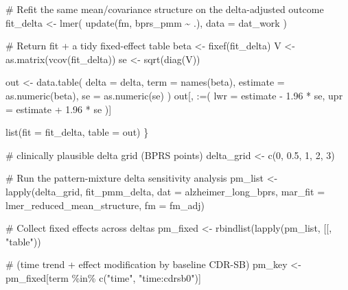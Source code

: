 \documentclass[
  9pt,
  letterpaper,
  DIV=11,
  numbers=noendperiod]{scrartcl}
\newenvironment{Shaded}{\begin{snugshade}}{\end{snugshade}}
\newcommand{\AttributeTok}[1]{\textcolor[rgb]{0.40,0.45,0.13}{#1}}
\newcommand{\CommentTok}[1]{\textcolor[rgb]{0.37,0.37,0.37}{#1}}
\newcommand{\DecValTok}[1]{\textcolor[rgb]{0.68,0.00,0.00}{#1}}
\newcommand{\FloatTok}[1]{\textcolor[rgb]{0.68,0.00,0.00}{#1}}
\newcommand{\FunctionTok}[1]{\textcolor[rgb]{0.28,0.35,0.67}{#1}}
\newcommand{\NormalTok}[1]{\textcolor[rgb]{0.00,0.23,0.31}{#1}}
\newcommand{\OtherTok}[1]{\textcolor[rgb]{0.00,0.23,0.31}{#1}}
\newcommand{\SpecialCharTok}[1]{\textcolor[rgb]{0.37,0.37,0.37}{#1}}
\newcommand{\StringTok}[1]{\textcolor[rgb]{0.13,0.47,0.30}{#1}}
\begin{document}
\begin{Shaded}
\begin{Highlighting}[]
  \CommentTok{\# Refit the same mean/covariance structure on the delta{-}adjusted outcome}
\NormalTok{  fit\_delta }\OtherTok{\textless{}{-}} \FunctionTok{lmer}\NormalTok{(}
    \FunctionTok{update}\NormalTok{(fm, bprs\_pmm }\SpecialCharTok{\textasciitilde{}}\NormalTok{ .),}
    \AttributeTok{data =}\NormalTok{ dat\_work}
\NormalTok{  )}

  \CommentTok{\# Return fit + a tidy fixed{-}effect table}
\NormalTok{  beta  }\OtherTok{\textless{}{-}} \FunctionTok{fixef}\NormalTok{(fit\_delta)}
\NormalTok{  V     }\OtherTok{\textless{}{-}} \FunctionTok{as.matrix}\NormalTok{(}\FunctionTok{vcov}\NormalTok{(fit\_delta))}
\NormalTok{  se    }\OtherTok{\textless{}{-}} \FunctionTok{sqrt}\NormalTok{(}\FunctionTok{diag}\NormalTok{(V))}

\NormalTok{  out }\OtherTok{\textless{}{-}} \FunctionTok{data.table}\NormalTok{(}
    \AttributeTok{delta =}\NormalTok{ delta,}
    \AttributeTok{term  =} \FunctionTok{names}\NormalTok{(beta),}
    \AttributeTok{estimate =} \FunctionTok{as.numeric}\NormalTok{(beta),}
    \AttributeTok{se =} \FunctionTok{as.numeric}\NormalTok{(se)}
\NormalTok{  )}
\NormalTok{  out[, }\StringTok{\textasciigrave{}}\AttributeTok{:=}\StringTok{\textasciigrave{}}\NormalTok{(}
    \AttributeTok{lwr =}\NormalTok{ estimate }\SpecialCharTok{{-}} \FloatTok{1.96} \SpecialCharTok{*}\NormalTok{ se,}
    \AttributeTok{upr =}\NormalTok{ estimate }\SpecialCharTok{+} \FloatTok{1.96} \SpecialCharTok{*}\NormalTok{ se}
\NormalTok{  )]}

  \FunctionTok{list}\NormalTok{(}\AttributeTok{fit =}\NormalTok{ fit\_delta, }\AttributeTok{table =}\NormalTok{ out)}
\NormalTok{\}}

\CommentTok{\# clinically plausible delta grid (BPRS points)}
\NormalTok{delta\_grid }\OtherTok{\textless{}{-}} \FunctionTok{c}\NormalTok{(}\DecValTok{0}\NormalTok{, }\FloatTok{0.5}\NormalTok{, }\DecValTok{1}\NormalTok{, }\DecValTok{2}\NormalTok{, }\DecValTok{3}\NormalTok{)}

\CommentTok{\# Run the pattern{-}mixture delta sensitivity analysis}
\NormalTok{pm\_list }\OtherTok{\textless{}{-}} \FunctionTok{lapply}\NormalTok{(delta\_grid, fit\_pmm\_delta,}
                  \AttributeTok{dat =}\NormalTok{ alzheimer\_long\_bprs,}
                  \AttributeTok{mar\_fit =}\NormalTok{ lmer\_reduced\_mean\_structure,}
                  \AttributeTok{fm =}\NormalTok{ fm\_adj)}

\CommentTok{\# Collect fixed effects across deltas}
\NormalTok{pm\_fixed }\OtherTok{\textless{}{-}} \FunctionTok{rbindlist}\NormalTok{(}\FunctionTok{lapply}\NormalTok{(pm\_list, }\StringTok{\textasciigrave{}}\AttributeTok{[[}\StringTok{\textasciigrave{}}\NormalTok{, }\StringTok{"table"}\NormalTok{))}

\CommentTok{\#  (time trend + effect modification by baseline CDR{-}SB)}
\NormalTok{pm\_key }\OtherTok{\textless{}{-}}\NormalTok{ pm\_fixed[term }\SpecialCharTok{\%in\%} \FunctionTok{c}\NormalTok{(}\StringTok{"time"}\NormalTok{, }\StringTok{"time:cdrsb0"}\NormalTok{)]}
\end{Highlighting}
\end{Shaded}
\end{document}
